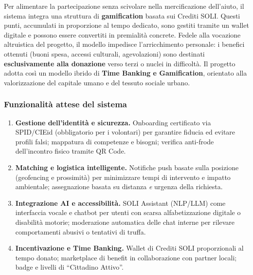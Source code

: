\documentclass[11pt,a4paper]{article}
\begin{document}
Per alimentare la partecipazione senza scivolare nella mercificazione dell'aiuto, il sistema integra una struttura di \textbf{gamification} basata sui Crediti SOLI. Questi punti, accumulati in proporzione al tempo dedicato, sono gestiti tramite un wallet digitale e possono essere convertiti in premialit\`a concrete. Fedele alla vocazione altruistica del progetto, il modello impedisce l'arricchimento personale: i benefici ottenuti (buoni spesa, accessi culturali, agevolazioni) sono destinati \textbf{esclusivamente alla donazione} verso terzi o nuclei in difficolt\`a. Il progetto adotta cos\`i un modello ibrido di \textbf{Time Banking e Gamification}, orientato alla valorizzazione del capitale umano e del tessuto sociale urbano.

\subsubsection{Funzionalit\`a attese del sistema}
\begin{enumerate}[leftmargin=1.4em]
  \item \textbf{Gestione dell'identit\`a e sicurezza.} Onboarding certificato via SPID/CIEid (obbligatorio per i volontari) per garantire fiducia ed evitare profili falsi; mappatura di competenze e bisogni; verifica anti-frode dell'incontro fisico tramite QR Code.
  \item \textbf{Matching e logistica intelligente.} Notifiche push basate sulla posizione (geofencing e prossimit\`a) per minimizzare tempi di intervento e impatto ambientale; assegnazione basata su distanza \emph{e} urgenza della richiesta.
  \item \textbf{Integrazione AI e accessibilit\`a.} SOLI Assistant (NLP/LLM) come interfaccia vocale e chatbot per utenti con scarsa alfabetizzazione digitale o disabilit\`a motorie; moderazione automatica delle chat interne per rilevare comportamenti abusivi o tentativi di truffa.
  \item \textbf{Incentivazione e Time Banking.} Wallet di Crediti SOLI proporzionali al tempo donato; marketplace di benefit in collaborazione con partner locali; badge e livelli di ``Cittadino Attivo''.
\end{enumerate}
\end{document}
